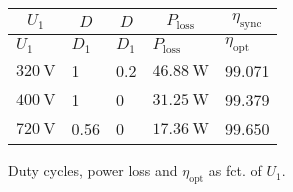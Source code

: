 
\begin{solutiontable}[ht]
    \centering  %
    \begin{tabular}{lllll}
        \toprule
        \multicolumn{1}{c}{$U_\mathrm{1}$} & \multicolumn{1}{c}{$D$} & 
        \multicolumn{1}{c}{$D$} & \multicolumn{1}{c}{$P_\mathrm{loss}$} & 
        \multicolumn{1}{c}{$\eta_\mathrm{sync}$} \\
        \midrule 
        $U_\mathrm{1}$ & $D_1$   & $D_1$ & $P_\mathrm{loss}$      & $\eta_\mathrm{opt}$ \\ 
        $\SI{320}{\volt}$ & 1    & 0.2   & $\SI{46.88}{\watt}$ & 99.071 \\ 
        $\SI{400}{\volt}$ & 1    & 0     & $\SI{31.25}{\watt}$ & 99.379 \\ 
        $\SI{720}{\volt}$ & 0.56 & 0     & $\SI{17.36}{\watt}$ & 99.650 \\ 
        \bottomrule
    \end{tabular}
    \caption{Duty cycles, power loss and $\eta_\mathrm{opt}$ as fct. of $U_\mathrm{1}$.}
    \label{table:PowerlossDutyCycleEfficiencyOpt}  
\end{solutiontable}